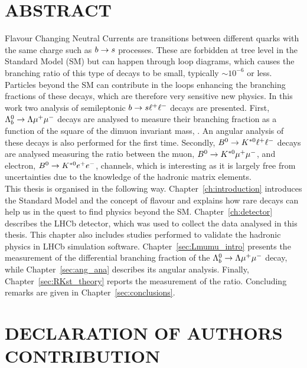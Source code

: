 \chapter*{ABSTRACT}

Flavour Changing Neutral Currents are transitions between different quarks with the same charge such as 
$b\rightarrow s$ processes. These are forbidden at tree level in the Standard Model (SM) but
can happen through loop diagrams, which causes the branching ratio of this type of decays
to be small, typically \mbox{$\sim10^{-6}$} or less. Particles beyond the SM can contribute in the loops enhancing
the branching fractions of these decays, which are therefore very sensitive new physics.
In this work two analysis of semileptonic $b\rightarrow s\ell^+ \ell^-$ decays are presented.
First, $\Lambda^0_b\rightarrow\Lambda\mu^+\mu^-$ decays are analysed to measure their branching fraction as a function
of the square of the dimuon invariant mass, \qsq. An angular analysis of these decays is also performed for the first time. 
Secondly, $B^0\rightarrow K^{*0}\ell^+ \ell^-$ decays are analysed measuring the \RKst ratio between the muon, $B^0\rightarrow K^{*0}\mu^+\mu^-$, 
and electron, $B^0\rightarrow K^{*0}e^+ e^-$, channels, which is interesting as it is largely free
from uncertainties due to the knowledge of the hadronic matrix elements. 	\\
This thesis is organised in the following way. Chapter~\ref{ch:introduction} introduces the Standard Model and 
the concept of flavour and explains how rare decays can help us in the quest to find physics beyond the SM.
Chapter~\ref{ch:detector} describes the LHCb detector, which was used to collect the data analysed in this thesis.
This chapter also includes studies performed to validate the hadronic physics in LHCb simulation software.
Chapter~\ref{sec:Lmumu_intro} presents the measurement of the differential branching fraction 
of the $\Lambda^0_b\rightarrow\Lambda\mu^+\mu^-$ decay, while Chapter~\ref{sec:ang_ana} describes its angular analysis.
Finally, Chapter~\ref{sec:RKst_theory} reports the measurement of the \RKst ratio. 
Concluding remarks are given in Chapter~\ref{sec:conclusions}.

\clearpage

\chapter*{DECLARATION OF AUTHORS CONTRIBUTION}

